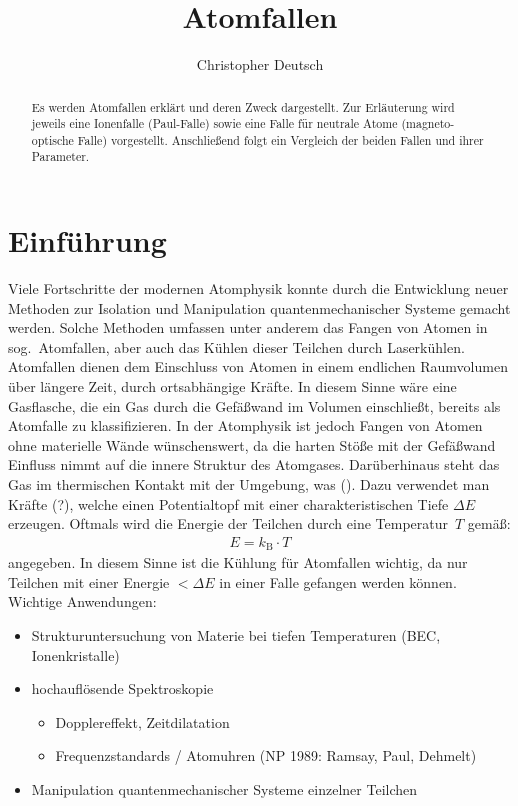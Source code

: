 \documentclass[twocolumn]{revtex4}
\begin{document}
\title{Atomfallen}

\author{Christopher Deutsch}




\begin{abstract}
%
Es werden Atomfallen erklärt und deren Zweck dargestellt. Zur Erläuterung wird jeweils eine Ionenfalle (Paul-Falle) sowie eine Falle für neutrale Atome (magneto-optische Falle) vorgestellt. Anschließend folgt ein Vergleich der beiden Fallen und ihrer Parameter.
%
\end{abstract}

\maketitle

\section{Einführung}
Viele Fortschritte der modernen Atomphysik konnte durch die Entwicklung neuer Methoden zur Isolation und Manipulation quantenmechanischer Systeme gemacht werden.
Solche Methoden umfassen unter anderem das Fangen von Atomen in sog.~Atomfallen, aber auch das Kühlen dieser Teilchen durch Laserkühlen.
Atomfallen dienen dem Einschluss von Atomen in einem endlichen Raumvolumen über längere Zeit, durch ortsabhängige Kräfte.
In diesem Sinne wäre eine Gasflasche, die ein Gas durch die Gefäßwand im Volumen einschließt, bereits als Atomfalle zu klassifizieren.
In der Atomphysik ist jedoch Fangen von Atomen ohne materielle Wände wünschenswert, da die harten Stöße mit der Gefäßwand Einfluss nimmt auf die innere Struktur des Atomgases.
Darüberhinaus steht das Gas im thermischen Kontakt mit der Umgebung, was ().
Dazu verwendet man Kräfte (?), welche einen Potentialtopf mit einer charakteristischen Tiefe $\Delta E$ erzeugen.
Oftmals wird die Energie der Teilchen durch eine Temperatur~$T$ gemäß:
\begin{align}
	E = k_\mathrm{B} \cdot T
\end{align}
angegeben.
In diesem Sinne ist die Kühlung für Atomfallen wichtig, da nur Teilchen mit einer Energie $< \Delta E$ in einer Falle gefangen werden können.
Wichtige Anwendungen:
\begin{itemize}
	\item Strukturuntersuchung von Materie bei tiefen Temperaturen (BEC, Ionenkristalle)
	\item hochauflösende Spektroskopie
	\begin{itemize}
		\item Dopplereffekt, Zeitdilatation
		\item Frequenzstandards / Atomuhren (NP 1989: Ramsay, Paul, Dehmelt)
	\end{itemize}
	\item Manipulation quantenmechanischer Systeme einzelner Teilchen
\end{itemize}
\end{document}
